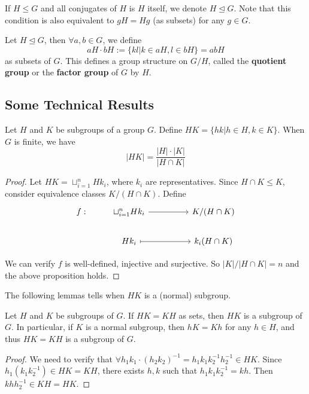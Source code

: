 \documentclass[11pt,fleqn]{book} %
\begin{document}
\begin{CJK}{UTF8}{gkai}
\begin{definition}
	 If $H \leq G$ and all conjugates of $H$ is $H$ itself, we denote $H \unlhd G$.
	Note that this condition is also equivalent to $gH = Hg$
	(as subsets) for any $g \in G$. 
\end{definition}

\begin{definition}
	 Let $H \unlhd G$, then $\forall a,b \in G$, we define
	\[aH \cdot bH:=\{kl | k\in aH, l \in bH\} = abH\]
	as subsets of $G$. This defines a group structure on $G/H$, called the {\bf quotient group} or the {\bf factor group} of $G$ by $H$.  
\end{definition}

\subsection{Some Technical Results}
\begin{proposition}
	Let $H$ and $K$ be subgroups of a group $G$. Define $HK = \{hk | h\in H, k\in K\}$. When $G$ is finite, we have 
	\[|HK| = \frac {|H| \cdot |K|} {|H \cap K|}\]
\end{proposition}

\begin{proof}
	Let $HK = \sqcup_{i=1}^n Hk_i$, where $k_i$ are representatives. Since $H\cap K \le K$, consider equivalence classes $K / (H \cap K)$. Define 
	\[\begin{tikzcd}
		{f:} & {\sqcup_{i=1}^n Hk_i} && {K/(H\cap K)} \\
		& {Hk_i} && {k_i(H\cap K)}
		\arrow[from=1-2, to=1-4]
		\arrow[maps to, from=2-2, to=2-4]
	\end{tikzcd}\]

	We can verify $f$ is well-defined, injective and surjective. So $|K| / |H\cap K| = n$ and the above proposition holds.
\end{proof}

The following lemmas tells when $HK$ is a (normal) subgroup.
\begin{lemma}
	Let $H$ and $K$ be subgroups of $G$. If $HK = KH$ as sets, then $HK$ is a subgroup of $G$.
	In particular, if $K$ is a normal subgroup, then $hK = Kh$ for any $h \in H$, and thus $HK = KH$ is a subgroup of $G$.
\end{lemma}
\begin{proof}
	We need to verify that $\forall h_1k_1 \cdot (h_2k_2)^{-1} = h_1k_1k_2^{-1}h_2^{-1}\in HK$. Since $h_1(k_1k_2^{-1}) \in HK = KH$, there exists $h,k$ such that $h_1k_1k_2^{-1} = kh$. 
	Then $khh_2^{-1} \in KH = HK$.
\end{proof}


\end{CJK}
\end{document}
